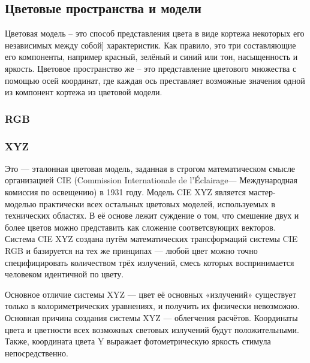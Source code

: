 \subsection {Цветовые пространства и модели}
Цветовая модель -- это способ представления цвета в виде кортежа некоторых его независимых между собой] характеристик. Как правило, это три составляющие его компоненты, например красный, зелёный и синий или тон, насыщенность и яркость. Цветовое пространство же -- это представление цветового множества с помощью осей координат, где каждая ось преставляет возможные значения одной из компонент кортежа из цветовой модели. 

\subsubsection{RGB}

\subsubsection{XYZ}
Это — эталонная цветовая модель, заданная в строгом математическом смысле организацией CIE (Commission Internationale de l'Éclairage— Международная комиссия по освещению) в 1931 году. Модель CIE XYZ является мастер-моделью практически всех остальных цветовых моделей, используемых в технических областях. В её основе лежит суждение о том, что смешение двух и более цветов можно представить как сложение соответсвующих векторов. Система CIE XYZ создана путём математических трансформаций системы CIE RGB и базируется на тех же принципах — любой цвет можно точно специфицировать количеством трёх излучений, смесь которых воспринимается человеком идентичной по цвету.



\begin{figure}[ht!]
\end{figure}

 Основное отличие системы XYZ — цвет её основных «излучений» существует только в колориметрических уравнениях, и получить их физически невозможно.
Основная причина создания системы XYZ — облегчения расчётов. Координаты цвета и цветности всех возможных световых излучений будут положительными. Также, координата цвета Y выражает фотометрическую яркость стимула непосредственно.
